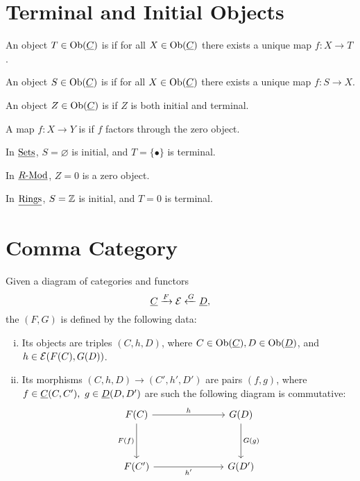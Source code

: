 \section{Terminal and Initial Objects}

\begin{definitions*}
	\item An object \( T \in \operatorname{Ob}(\underline{C}) \) is  if for all \( X \in \operatorname{Ob}(\underline{C}) \) there exists a unique map \( f: X \to T \).

	\item An object \( S \in \operatorname{Ob}(\underline{C}) \) is  if for all \( X \in \operatorname{Ob}(\underline{C}) \) there exists a unique map \( f: S \to X \).

	\item An object \( Z \in \operatorname{Ob}(\underline{C}) \) is  if \( Z \) is both initial and terminal.
	\item A map \( f: X \to Y \) is  if \( f \) factors through the zero object.
\end{definitions*}

\begin{examples*}
	\item In \( \underline{\mathrm{Sets}} \), \( S = \varnothing \) is initial, and \( T = \{\bullet\} \) is terminal.
	\item In \( \underline{R\text{-}\mathrm{Mod}} \), \( Z = 0 \) is a zero object.
	\item In \( \underline{\mathrm{Rings}} \), \( S = \mathbb{Z} \) is initial, and \( T = 0 \) is terminal.
\end{examples*}

\section{Comma Category}

\begin{definition*}
	Given a diagram of categories and functors
	\[
		\underline{C} \xrightarrow{F} \mathcal{E} \xleftarrow{G} \underline{D},
	\]
	the  \( (F \comma G) \) is defined by the following data:
	\begin{enumerate}[i)]
		\item Its objects are triples \( (C, h, D) \), where \( C \in \operatorname{Ob}(\underline{C}), D \in \operatorname{Ob}(\underline{D}) \), and \( h \in \mathcal{E}(F(C), G(D)) \).
		\item Its morphisms \( (C, h, D) \to (C', h', D') \) are pairs \( (f, g) \), where \( f \in \underline{C}(C, C'),~ g \in \underline{D}(D, D') \)
			are such the following diagram is commutative:
			\[
				\begin{tikzcd}{F(C)} &&& {G(D)} \\
					\\
					{F(C')} &&& {G(D')}
					\arrow["h", from=1-1, to=1-4]
					\arrow["{F(f)}"', from=1-1, to=3-1]
					\arrow["{G(g)}", from=1-4, to=3-4]
					\arrow["{h'}"', from=3-1, to=3-4]
				\end{tikzcd}
			\]
	\end{enumerate}
\end{definition*}

